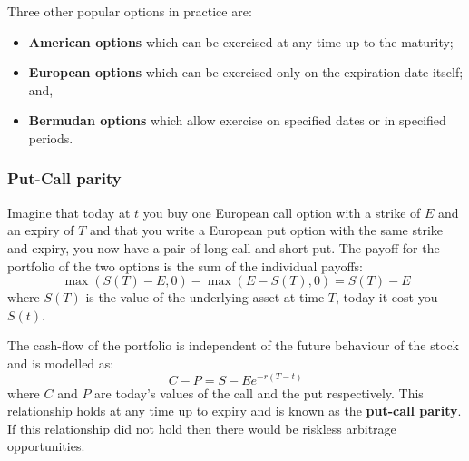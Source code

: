 Three other popular options in practice are:
\begin{itemize}
    \setlength\itemsep{0em}
    \item \textbf{American options} which can be exercised at any time up to the maturity;
    \item \textbf{European options} which can be exercised only on the expiration date itself; and,
    \item \textbf{Bermudan options} which allow exercise on specified dates or in specified periods.
\end{itemize} 


\subsubsection{Put-Call parity}
Imagine that today at $t$ you buy one European call option with a strike of $E$ and an expiry of $T$ and that you write a European put option with the same strike and expiry, you now have a pair of long-call and short-put. The payoff for the portfolio of the two options is the sum of the individual payoffs:
\begin{equation}
    \max(S(T) - E, 0) - \max(E - S(T), 0) = S(T) - E
\end{equation}  
where $S(T)$ is the value of the underlying asset at time $T$, today it cost you $S(t)$. 

The cash-flow of the portfolio is independent of the future behaviour of the stock and is modelled as:
\begin{equation}
    C - P = S - Ee^{-r(T-t)}
\end{equation}  
where $C$ and $P$ are today's values of the call and the put respectively. This relationship holds at any time up to expiry and is known as the \textbf{put-call parity}. If this relationship did not hold then there would be riskless arbitrage opportunities.
 

